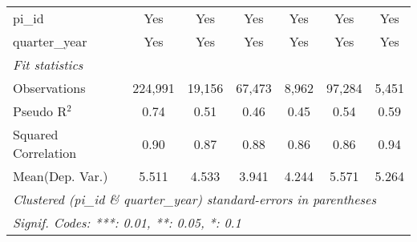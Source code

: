 \begin{tabular}{lcccccc}
   pi\_id                                                     & Yes           & Yes            & Yes           & Yes           & Yes           & Yes\\  
   quarter\_year                                              & Yes           & Yes            & Yes           & Yes           & Yes           & Yes\\  
   \midrule
   \emph{Fit statistics}\\
   Observations                                               & 224,991       & 19,156         & 67,473        & 8,962         & 97,284        & 5,451\\  
   Pseudo R$^2$                                               & 0.74          & 0.51           & 0.46          & 0.45          & 0.54          & 0.59\\  
   Squared Correlation                                        & 0.90          & 0.87           & 0.88          & 0.86          & 0.86          & 0.94\\  
Mean(Dep. Var.) & 5.511 & 4.533 & 3.941 & 4.244 & 5.571 & 5.264 \\
   \midrule \midrule
   \multicolumn{7}{l}{\emph{Clustered (pi\_id \& quarter\_year) standard-errors in parentheses}}\\
   \multicolumn{7}{l}{\emph{Signif. Codes: ***: 0.01, **: 0.05, *: 0.1}}\\
\end{tabular}
\par\endgroup
